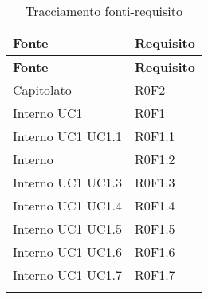 \def\arraystretch{1.5}
\begin{longtable}{p{2.5cm}!{\VRule[1pt]}p{2.5cm}}
\color{white} \textbf{Fonte} & \color{white} \textbf{Requisito} \\ 
\endfirsthead 
{} 
\color{white} \textbf{Fonte} & \color{white} \textbf{Requisito} \\ 
\endhead 
Capitolato & R0F2 \\
Interno \newline UC1
 & R0F1 \\
Interno \newline UC1
 \newline UC1.1
 & R0F1.1 \\
Interno & R0F1.2 \\
Interno \newline UC1
 \newline UC1.3
 & R0F1.3 \\
Interno \newline UC1
 \newline UC1.4
 & R0F1.4 \\
Interno \newline UC1
 \newline UC1.5
 & R0F1.5 \\
Interno \newline UC1
 \newline UC1.6
 & R0F1.6 \\
Interno \newline UC1
 \newline UC1.7
 & R0F1.7 \\
\caption{Tracciamento fonti-requisito}
\end{longtable}